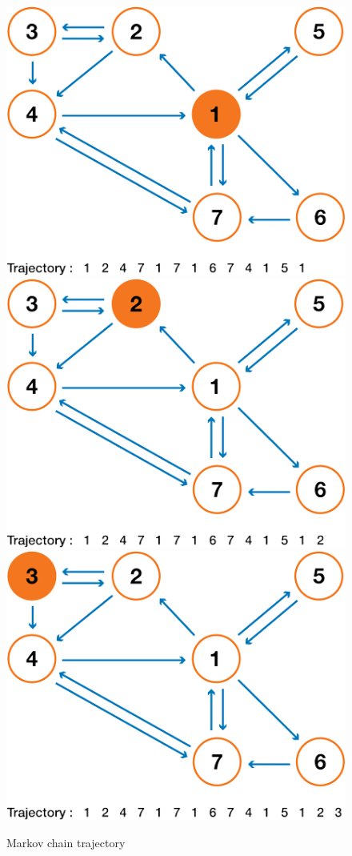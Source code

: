\begin{figure}[h]
\includegraphics[width=.3\textwidth]{pic/p05c06-snip10-12.png}
\includegraphics[width=.3\textwidth]{pic/p05c06-snip10-13.png}
\includegraphics[width=.3\textwidth]{pic/p05c06-snip10-14.png}
    \caption{Markov chain trajectory}
    \label{fig:p05c06-snip10}
\end{figure}

\FloatBarrier


